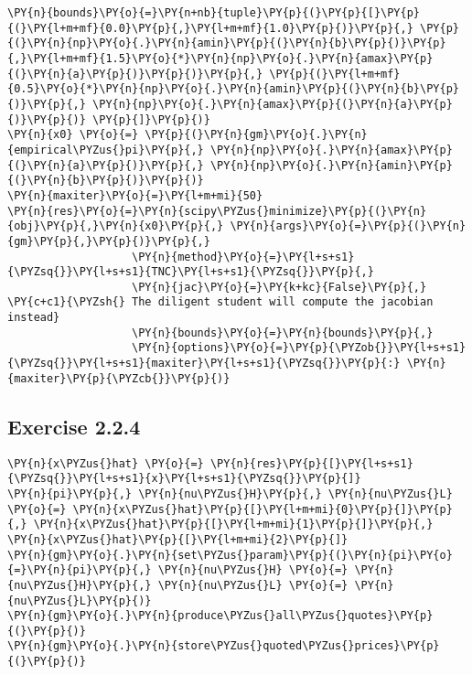 \documentclass[9pt]{article}
\begin{document}
    \begin{tcolorbox}[breakable, size=fbox, boxrule=1pt, pad at break*=1mm,colback=cellbackground, colframe=cellborder]
\begin{Verbatim}[commandchars=\\\{\}]
\PY{n}{bounds}\PY{o}{=}\PY{n+nb}{tuple}\PY{p}{(}\PY{p}{[}\PY{p}{(}\PY{l+m+mf}{0.0}\PY{p}{,}\PY{l+m+mf}{1.0}\PY{p}{)}\PY{p}{,} \PY{p}{(}\PY{n}{np}\PY{o}{.}\PY{n}{amin}\PY{p}{(}\PY{n}{b}\PY{p}{)}\PY{p}{,}\PY{l+m+mf}{1.5}\PY{o}{*}\PY{n}{np}\PY{o}{.}\PY{n}{amax}\PY{p}{(}\PY{n}{a}\PY{p}{)}\PY{p}{)}\PY{p}{,} \PY{p}{(}\PY{l+m+mf}{0.5}\PY{o}{*}\PY{n}{np}\PY{o}{.}\PY{n}{amin}\PY{p}{(}\PY{n}{b}\PY{p}{)}\PY{p}{,} \PY{n}{np}\PY{o}{.}\PY{n}{amax}\PY{p}{(}\PY{n}{a}\PY{p}{)}\PY{p}{)} \PY{p}{]}\PY{p}{)}
\PY{n}{x0} \PY{o}{=} \PY{p}{(}\PY{n}{gm}\PY{o}{.}\PY{n}{empirical\PYZus{}pi}\PY{p}{,} \PY{n}{np}\PY{o}{.}\PY{n}{amax}\PY{p}{(}\PY{n}{a}\PY{p}{)}\PY{p}{,} \PY{n}{np}\PY{o}{.}\PY{n}{amin}\PY{p}{(}\PY{n}{b}\PY{p}{)}\PY{p}{)}
\PY{n}{maxiter}\PY{o}{=}\PY{l+m+mi}{50}
\PY{n}{res}\PY{o}{=}\PY{n}{scipy\PYZus{}minimize}\PY{p}{(}\PY{n}{obj}\PY{p}{,}\PY{n}{x0}\PY{p}{,} \PY{n}{args}\PY{o}{=}\PY{p}{(}\PY{n}{gm}\PY{p}{,}\PY{p}{)}\PY{p}{,}
                   \PY{n}{method}\PY{o}{=}\PY{l+s+s1}{\PYZsq{}}\PY{l+s+s1}{TNC}\PY{l+s+s1}{\PYZsq{}}\PY{p}{,}
                   \PY{n}{jac}\PY{o}{=}\PY{k+kc}{False}\PY{p}{,} \PY{c+c1}{\PYZsh{} The diligent student will compute the jacobian instead}
                   \PY{n}{bounds}\PY{o}{=}\PY{n}{bounds}\PY{p}{,}
                   \PY{n}{options}\PY{o}{=}\PY{p}{\PYZob{}}\PY{l+s+s1}{\PYZsq{}}\PY{l+s+s1}{maxiter}\PY{l+s+s1}{\PYZsq{}}\PY{p}{:} \PY{n}{maxiter}\PY{p}{\PYZcb{}}\PY{p}{)}
\end{Verbatim}
\end{tcolorbox}

    \hypertarget{exercise-2.2.4}{%
\subsection*{Exercise 2.2.4}\label{exercise-2.2.4}}

    \begin{tcolorbox}[breakable, size=fbox, boxrule=1pt, pad at break*=1mm,colback=cellbackground, colframe=cellborder]
\begin{Verbatim}[commandchars=\\\{\}]
\PY{n}{x\PYZus{}hat} \PY{o}{=} \PY{n}{res}\PY{p}{[}\PY{l+s+s1}{\PYZsq{}}\PY{l+s+s1}{x}\PY{l+s+s1}{\PYZsq{}}\PY{p}{]}
\PY{n}{pi}\PY{p}{,} \PY{n}{nu\PYZus{}H}\PY{p}{,} \PY{n}{nu\PYZus{}L} \PY{o}{=} \PY{n}{x\PYZus{}hat}\PY{p}{[}\PY{l+m+mi}{0}\PY{p}{]}\PY{p}{,} \PY{n}{x\PYZus{}hat}\PY{p}{[}\PY{l+m+mi}{1}\PY{p}{]}\PY{p}{,} \PY{n}{x\PYZus{}hat}\PY{p}{[}\PY{l+m+mi}{2}\PY{p}{]}
\PY{n}{gm}\PY{o}{.}\PY{n}{set\PYZus{}param}\PY{p}{(}\PY{n}{pi}\PY{o}{=}\PY{n}{pi}\PY{p}{,} \PY{n}{nu\PYZus{}H} \PY{o}{=} \PY{n}{nu\PYZus{}H}\PY{p}{,} \PY{n}{nu\PYZus{}L} \PY{o}{=} \PY{n}{nu\PYZus{}L}\PY{p}{)}
\PY{n}{gm}\PY{o}{.}\PY{n}{produce\PYZus{}all\PYZus{}quotes}\PY{p}{(}\PY{p}{)}
\PY{n}{gm}\PY{o}{.}\PY{n}{store\PYZus{}quoted\PYZus{}prices}\PY{p}{(}\PY{p}{)}
\end{Verbatim}
\end{tcolorbox}
\end{document}
